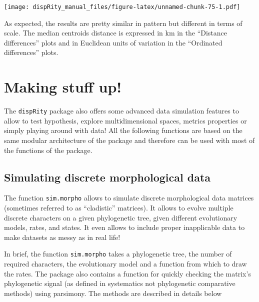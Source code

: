 \documentclass[]{book}
\theoremstyle{definition}
\theoremstyle{definition}
\theoremstyle{remark}
\begin{document}
\texttt{[image: dispRity\_manual\_files/figure-latex/unnamed-chunk-75-1.pdf]}

As expected, the results are pretty similar in pattern but different in
terms of scale. The median centroids distance is expressed in km in the
``Distance differences'' plots and in Euclidean units of variation in
the ``Ordinated differences'' plots.

\chapter{Making stuff up!}\label{making-stuff-up}

The \texttt{dispRity} package also offers some advanced data simulation
features to allow to test hypothesis, explore multidimensional spaces,
metrics properties or simply playing around with data! All the following
functions are based on the same modular architecture of the package and
therefore can be used with most of the functions of the package.

\section{Simulating discrete morphological
data}\label{simulating-discrete-morphological-data}

The function \texttt{sim.morpho} allows to simulate discrete
morphological data matrices (sometimes referred to as ``cladistic''
matrices). It allows to evolve multiple discrete characters on a given
phylogenetic tree, given different evolutionary models, rates, and
states. It even allows to include proper inapplicable data to make
datasets as messy as in real life!

In brief, the function \texttt{sim.morpho} takes a phylogenetic tree,
the number of required characters, the evolutionary model and a function
from which to draw the rates. The package also contains a function for
quickly checking the matrix's phylogenetic signal (as defined in
systematics not phylogenetic comparative methods) using parsimony. The
methods are described in details below
\end{document}
